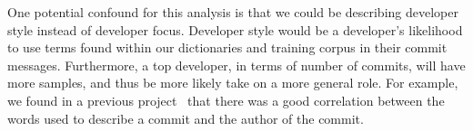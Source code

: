 \documentclass[smallextended]{svjour3}       %
\begin{document}
One potential confound for this analysis is that we could be
describing developer style instead of developer focus. Developer style
would be a developer's likelihood to use terms found within
our dictionaries and training corpus in their commit messages. Furthermore, a top developer, in
terms of number of commits, will have more samples, and thus be more likely
take on a more general role. For example, we found in a previous
project~\cite{largechanges} that there was a good correlation between the words used to describe a commit
and the author of the commit. 




\end{document}
